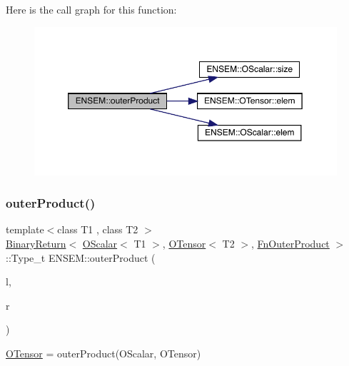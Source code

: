 Here is the call graph for this function\+:\nopagebreak
\begin{figure}[H]
\begin{center}
\leavevmode
\includegraphics[width=350pt]{de/d87/group__obstensor_ga2f3f321adaac09837bf726a64c539c11_cgraph}
\end{center}
\end{figure}
\mbox{\label{group__obstensor_ga4b391fbdb7626ccda42a2068c3ff5ba2}} 
\subsubsection{\texorpdfstring{outerProduct()}{outerProduct()}\hspace{0.1cm}{\footnotesize\ttfamily [3/3]}}
{\footnotesize\ttfamily template$<$class T1 , class T2 $>$ \\
\mbox{\hyperlink{structENSEM_1_1BinaryReturn}{Binary\+Return}}$<$ \mbox{\hyperlink{classENSEM_1_1OScalar}{O\+Scalar}}$<$ T1 $>$, \mbox{\hyperlink{classENSEM_1_1OTensor}{O\+Tensor}}$<$ T2 $>$, \mbox{\hyperlink{structENSEM_1_1FnOuterProduct}{Fn\+Outer\+Product}} $>$\+::Type\+\_\+t E\+N\+S\+E\+M\+::outer\+Product (\begin{DoxyParamCaption}\item[{const \mbox{\hyperlink{classENSEM_1_1OScalar}{O\+Scalar}}$<$ T1 $>$ \&}]{l,  }\item[{const \mbox{\hyperlink{classENSEM_1_1OTensor}{O\+Tensor}}$<$ T2 $>$ \&}]{r }\end{DoxyParamCaption})\hspace{0.3cm}{\ttfamily [inline]}}



\mbox{\hyperlink{classENSEM_1_1OTensor}{O\+Tensor}} = outer\+Product(\+O\+Scalar, O\+Tensor) 

